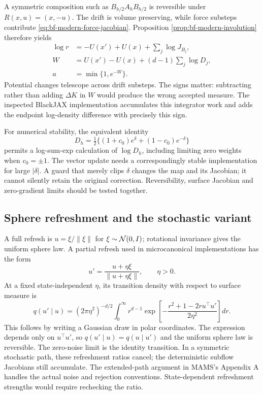 A symmetric composition such as $B_{h/2}A_hB_{h/2}$ is reversible under
$R(x,u)=(x,-u)$. The drift is volume preserving, while force substeps
contribute \eqref{eq:bf-modern-force-jacobian}. Proposition
\ref{prop:bf-modern-involution} therefore yields
\begin{align}
 \log r&=-U(x')+U(x)+\sum_j\log J_{B_j},\\
 W&=U(x')-U(x)+(d-1)\sum_j\log D_j,\\
 a&=\min\{1,e^{-W}\}.
 \label{eq:bf-modern-mams-acceptance}
\end{align}
Potential changes telescope across drift substeps. The signs matter:
subtracting rather than adding $\Delta K$ in $W$ would produce the wrong
accepted measure. The inspected BlackJAX implementation accumulates this
integrator work and adds the endpoint log-density difference with precisely
this sign.

For numerical stability, the equivalent identity
\begin{equation}
 D_h=\tfrac12\{(1+c_0)e^\delta+(1-c_0)e^{-\delta}\}
 \label{eq:bf-modern-stable-force-denominator}
\end{equation}
permits a log-sum-exp calculation of $\log D_h$, including limiting zero
weights when $c_0=\pm1$. The vector update needs a correspondingly stable
implementation for large $|\delta|$. A guard that merely clips $\delta$
changes the map and its Jacobian; it cannot silently retain the original
correction. Reversibility, surface Jacobian and zero-gradient limits should
be tested together.

\subsection{Sphere refreshment and the stochastic variant}

A full refresh is $u=\xi/\|\xi\|$ for
$\xi\sim\mathcal{N}(0,I)$; rotational invariance gives the uniform sphere law.
A partial refresh used in microcanonical implementations has the form
\citep{robnik2025mclmc,robnik2025mams}
\begin{equation}
 u'=\frac{u+\eta\xi}{\|u+\eta\xi\|},\qquad \eta>0.
 \label{eq:bf-modern-sphere-refresh}
\end{equation}
At a fixed state-independent $\eta$, its transition density with respect to
surface measure is
\begin{equation}
 q(u'\mid u)=(2\pi\eta^2)^{-d/2}\int_0^\infty r^{d-1}
    \exp\!\left[-\frac{r^2+1-2r u^\top u'}{2\eta^2}\right]dr.
 \label{eq:bf-modern-sphere-refresh-density}
\end{equation}
This follows by writing a Gaussian draw in polar coordinates. The expression
depends only on $u^\top u'$, so $q(u'\mid u)=q(u\mid u')$ and the uniform
sphere law is reversible. The zero-noise limit is the identity transition.
In a symmetric stochastic path, these refreshment ratios cancel; the
deterministic subflow Jacobians still accumulate. The extended-path argument
in MAMS's Appendix A handles the actual noise and rejection conventions.
State-dependent refreshment strengths would require rechecking the ratio.

